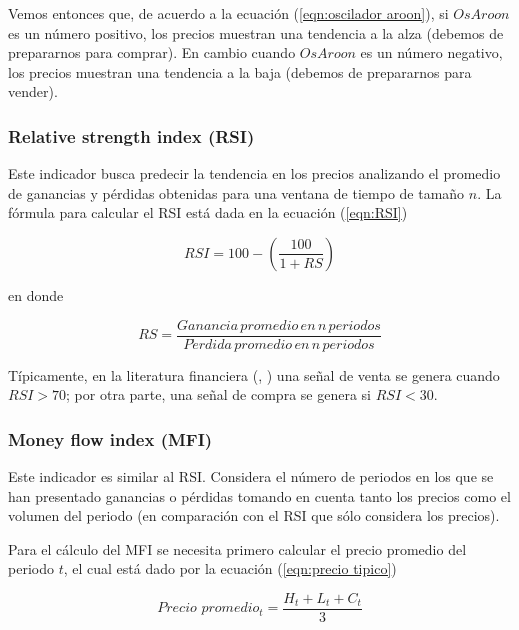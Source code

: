 \documentclass[12pt]{scrbook}
\theoremstyle{break}
\theoremstyle{break}
\begin{document}
Vemos entonces que, de acuerdo a la ecuación (\ref{eqn:oscilador aroon}), si $OsAroon$ es un número positivo, los precios muestran una tendencia a la alza (debemos de prepararnos para comprar). En cambio cuando $OsAroon$ es un número negativo, los precios muestran una tendencia a la baja (debemos de prepararnos para vender).

\subsubsection{Relative strength index (RSI)}
\label{subsubseccion:RSI}
Este indicador busca predecir la tendencia en los precios analizando el promedio de ganancias y pérdidas obtenidas para una ventana de tiempo de tamaño $n$. La fórmula para calcular el RSI está dada en la ecuación (\ref{eqn:RSI})

\begin{equation} \label{eqn:RSI}
RSI = 100 - \left( \frac{100}{1 + RS} \right)
\end{equation}

en donde 

\begin{equation} \label{eqn:RSI RS}
RS = \frac{Ganancia\,promedio\,en\,n\,periodos}{P\acute{e}rdida\,promedio\,en\,n\,periodos}
\end{equation}

Típicamente, en la literatura financiera (\cite{technicalAnalysisKirkPatrick}, \cite{encycoplediaTechnicalIndicators}) una señal de venta se genera cuando $RSI > 70$; por otra parte, una señal de compra se genera si $RSI < 30$.

\subsubsection{Money flow index (MFI)}
\label{subsubseccion:money flow index}
Este indicador es similar al RSI. Considera el número de periodos en los que se han presentado ganancias o pérdidas tomando en cuenta tanto los precios como el volumen del periodo (en comparación con el RSI que sólo considera los precios).

Para el cálculo del MFI se necesita primero calcular el precio promedio del periodo $t$, el cual está dado por la ecuación (\ref{eqn:precio tipico})

\begin{equation} \label{eqn:precio tipico}
Precio\, \, promedio_t = \dfrac{H_{t} + L_{t} + C_{t}}{3}
\end{equation}
\end{document}
